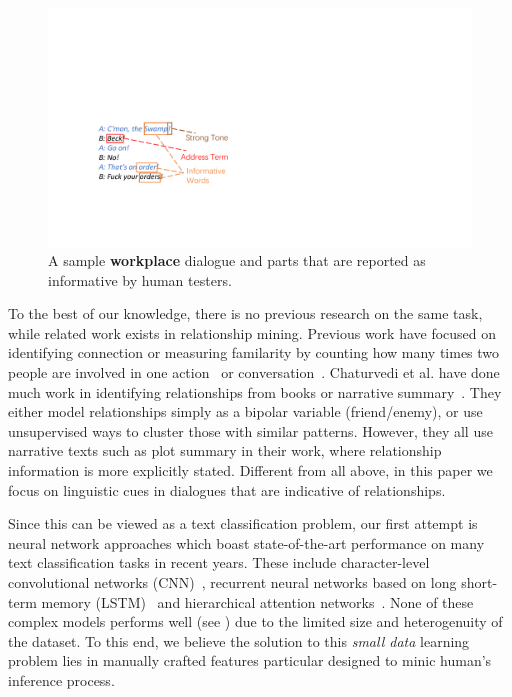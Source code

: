 \begin{figure}[t!]
	\centering
	\includegraphics[width=0.85\columnwidth]{instinct.pdf}
	\caption{A sample \textbf{workplace} dialogue and parts that are reported as informative by human testers.}
	\label{fig:instinct}
\end{figure}
To the best of our knowledge, there is no previous research on the same task, 
while related work exists in relationship mining. 
Previous work have focused on
identifying connection or measuring familarity by counting 
how many times two people are involved in one action~\cite{relation-act} 
or conversation~\cite{relation-conver}. 
Chaturvedi et al. have done much work in identifying relationships 
from books or narrative summary~\cite{rel-mining-1,rel-mining-2,rel-mining-3}. 
They either model relationships simply as a bipolar variable (friend/enemy), or use unsupervised ways to cluster those with similar patterns. However, they all use narrative texts such as plot summary in their work, where relationship information is more explicitly stated. Different from all above, in this paper we focus on linguistic cues in dialogues that are indicative of relationships.

Since this can be viewed as a text classification problem, our first attempt is
neural network approaches which boast state-of-the-art performance on many text classification tasks in recent years. These
include character-level convolutional networks (CNN)~\cite{cnn}, 
recurrent neural networks based on long short-term memory (LSTM)~\cite{lstm} 
and hierarchical attention networks~\cite{hierarchy}. 
None of these complex models performs well (see ) due to the limited size and 
heterogenuity of the dataset. 
To this end, we believe the solution to this {\em small data} learning problem
lies in manually crafted features particular designed to minic human's 
inference process. 

